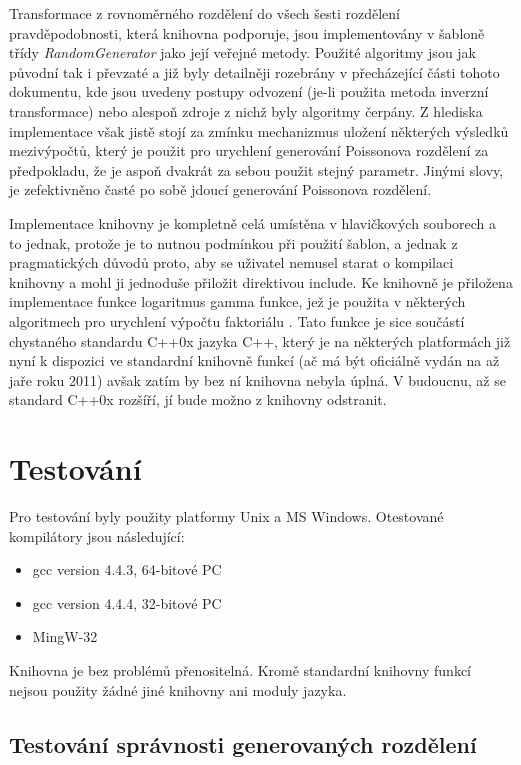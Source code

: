 \documentclass[a4paper,11pt]{article}
\begin{document}
Transformace z rovnoměrného rozdělení do všech šesti rozdělení pravděpodobnosti, která knihovna podporuje, jsou implementovány v šabloně třídy \emph{RandomGenerator} jako její veřejné metody. Použité algoritmy jsou jak původní tak i převzaté a již byly detailněji rozebrány v přecházející části tohoto dokumentu, kde jsou uvedeny postupy odvození (je-li použita metoda inverzní transformace) nebo alespoň zdroje z nichž byly algoritmy čerpány. Z hlediska implementace však jistě stojí za zmínku mechanizmus uložení některých výsledků mezivýpočtů, který je použit pro urychlení generování Poissonova rozdělení za předpokladu, že je aspoň dvakrát za sebou použit stejný parametr. Jinými slovy, je zefektivněno časté po sobě jdoucí generování Poissonova rozdělení. 

Implementace knihovny je kompletně celá umístěna v hlavičkových souborech a to jednak, protože je to nutnou podmínkou při použití šablon, a jednak z pragmatických důvodů proto, aby se uživatel nemusel starat o kompilaci knihovny a mohl ji jednoduše přiložit direktivou include. Ke knihovně je přiložena implementace funkce logaritmus gamma funkce, jež je použita v některých algoritmech pro urychlení výpočtu faktoriálu \cite{NR}. Tato funkce je sice součástí chystaného standardu C++0x jazyka C++, který je na některých platformách již nyní k dispozici ve standardní knihovně funkcí (ač má být oficiálně vydán na až jaře roku 2011) avšak zatím by bez ní knihovna nebyla úplná. V budoucnu, až se standard C++0x rozšíří, jí bude možno z knihovny odstranit.

\section{Testování}
Pro testování byly použity platformy Unix a MS Windows. Otestované kompilátory jsou následující:
\begin{itemize}
\item gcc version 4.4.3, 64-bitové PC
\item gcc version 4.4.4, 32-bitové PC
\item MingW-32
\end{itemize}

Knihovna je bez problémů přenositelná. Kromě standardní knihovny funkcí nejsou použity žádné jiné knihovny ani moduly jazyka.

\subsection{Testování správnosti generovaných rozdělení}
\end{document}

